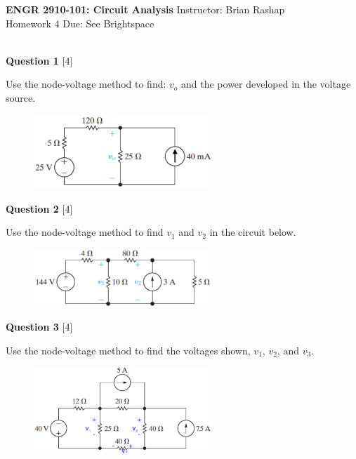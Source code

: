 \documentclass[12pt]{article}
\begin{document}
\begin{center}
\hfil
{\large\bf {ENGR 2910-101: Circuit Analysis}}
\hfill Instructor: Brian Rashap\\
Homework 4 \hfill Due: See Brightspace\\
\hrulefill\\
\end{center}

{\bf Question 1} [4] %

Use the node-voltage method to find: $v_{o}$ and the power developed in the voltage source.

\begin{figure}[h!]
\begin{center}
 \includegraphics[clip,width=0.6\textwidth]{Fig4-6-v2.png}
\end{center}
\end{figure}


\vspace{0.1in}

{\bf Question 2} [4] %

Use the node-voltage method to find $v_{1}$ and $v_{2}$ in the circuit below.
\begin{figure}[h!]
\begin{center}
 \includegraphics[clip,width=0.6\textwidth]{Fig4-11.png}
\end{center}
\end{figure}

{\bf Question 3} [4] %

Use the node-voltage method to find the voltages shown, $v_{1}$, $v_{2}$, and $v_{3}$.

\begin{figure}[h!]
\begin{center}
 \includegraphics[clip,width=0.6\textwidth]{Fig4-15.png}
\end{center}
\end{figure}
\end{document}
